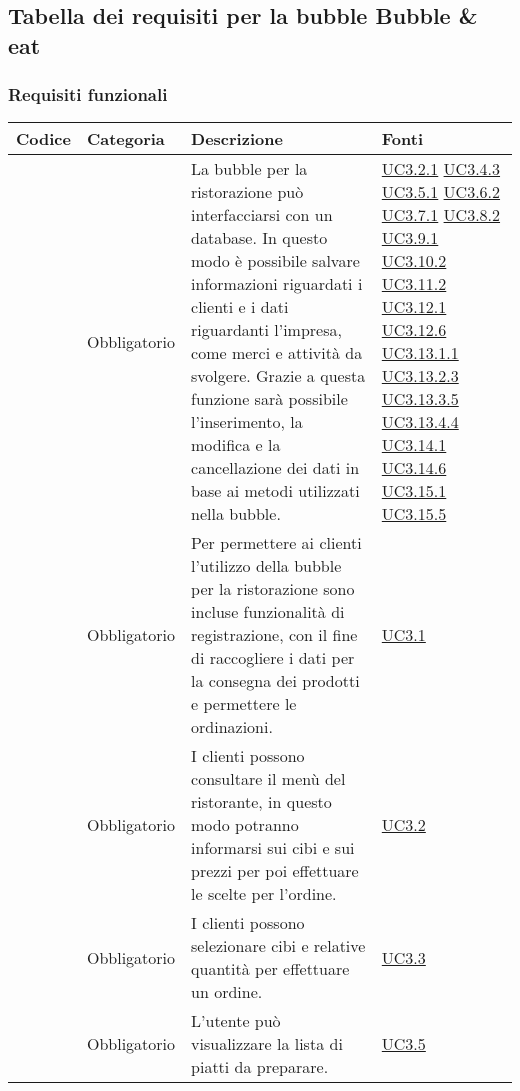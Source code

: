 \subsection{Tabella dei requisiti per la bubble Bubble \& eat}

\subsubsection{Requisiti funzionali}

\begin{longtable}{|P{1.5cm}|P{2.5cm}|P{6.5cm}|P{2.5cm}|}
	\hline \textbf{Codice} & \textbf{Categoria} & \textbf{Descrizione} & \textbf{Fonti} \\
	\hline \RequisitoObF\label{L21} & Obbligatorio & La bubble per la ristorazione può interfacciarsi con un database. In questo modo è possibile salvare informazioni riguardati i clienti e i dati riguardanti l'impresa, come merci e attività da svolgere. Grazie a questa funzione sarà possibile l'inserimento, la modifica e la cancellazione dei dati in base ai metodi utilizzati nella bubble. & \hyperref[UC3.2.1]{UC3.2.1} \hyperref[UC3.4.3]{UC3.4.3} \hyperref[UC3.5.1]{UC3.5.1} \hyperref[UC3.6.2]{UC3.6.2} \hyperref[UC3.7.1]{UC3.7.1} \hyperref[UC3.8.2]{UC3.8.2} \hyperref[UC3.9.1]{UC3.9.1} \hyperref[UC3.10.2]{UC3.10.2} \hyperref[UC3.11.2]{UC3.11.2} \hyperref[UC3.12.1]{UC3.12.1} \hyperref[UC3.12.6]{UC3.12.6} \hyperref[UC3.13.1.1]{UC3.13.1.1} \hyperref[UC3.13.2.3]{UC3.13.2.3} \hyperref[UC3.13.3.5]{UC3.13.3.5} \hyperref[UC3.13.4.4]{UC3.13.4.4} \hyperref[UC3.14.1]{UC3.14.1} \hyperref[UC3.14.6]{UC3.14.6} \hyperref[UC3.15.1]{UC3.15.1} \hyperref[UC3.15.5]{UC3.15.5} \\
	\hline \RequisitoObF\label{L22} & Obbligatorio & Per permettere ai clienti l'utilizzo della bubble per la ristorazione sono incluse funzionalità di registrazione, con il fine di raccogliere i dati per la consegna dei prodotti e permettere le ordinazioni. & \hyperref[UC3.1]{UC3.1} \\
	\hline \RequisitoObF\label{L23} & Obbligatorio & I clienti possono consultare il menù del ristorante, in questo modo potranno informarsi sui cibi e sui prezzi per poi effettuare le scelte per l'ordine. & \hyperref[UC3.2]{UC3.2} \\
	\hline \RequisitoObF\label{L24} & Obbligatorio & I clienti possono selezionare cibi e relative quantità per effettuare un ordine. & \hyperref[UC3.3]{UC3.3} \\
	\hline \RequisitoObF\label{L25} & Obbligatorio & L'utente  può visualizzare la lista di piatti da preparare. & \hyperref[UC3.5]{UC3.5} \\

\end{longtable}

